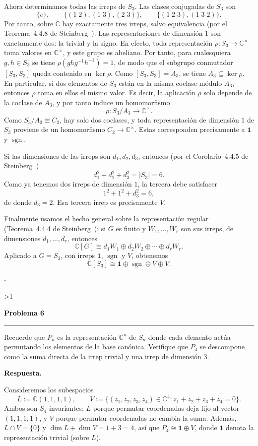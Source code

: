 \documentclass[10pt,a4paper]{article}
\newcommand{\CC}{\mathbb{C}}
\newcommand{\inlinehead}[2][repblue]{%
  \par\smallskip
  {\color{#1}\bfseries #2.}\hspace{0.45em}%
}
\newcommand{\answer}{\inlinehead{Respuesta}}
\newcounter{probcnt}
\newcommand{\problem}[2]{%
  \stepcounter{probcnt}%
  \ifnum\value{probcnt}>1\newpage\fi
  \par\vspace{0.25em}
  {\large\bfseries\color{repblue} Problema #1}\par
  {\color{repline}\rule{\linewidth}{0.55pt}}\par
  \begin{tcolorbox}[
    breakable,
    colback=white,
    colframe=repline,
    borderline west={1.6pt}{0pt}{repteal},
    left=0.7em,
    right=0.7em,
    top=0.35em,
    bottom=0.3em,
    before skip=0.35em,
    after skip=0.45em
  ]
    #2
  \end{tcolorbox}
}
\begin{document}
Ahora determinamos todas las irreps de $S_3$.
Las clases conjugadas de $S_3$ son
\[
  \{e\},\qquad \{(1\;2),(1\;3),(2\;3)\},\qquad \{(1\;2\;3),(1\;3\;2)\}.
\]
Por tanto, sobre $\CC$ hay exactamente tres irreps, salvo equivalencia
(por el Teorema~4.4.8 de Steinberg~\cite[Thm.~4.4.8]{Steinberg}).
Las representaciones de dimensión $1$ son exactamente dos: la trivial
y la signo. En efecto, toda representación $\rho\colon S_3\to \CC^{\times}$
toma valores en $\CC^{\times}$, y este grupo es abeliano.
Por tanto, para cualesquiera $g,h\in S_3$ se tiene
$\rho(ghg^{-1}h^{-1})=1$, de modo que el subgrupo conmutador
$[S_3,S_3]$ queda contenido en $\ker\rho$.
Como $[S_3,S_3]=A_3$, se tiene $A_3\subseteq \ker\rho$. En particular,
si dos elementos de $S_3$ están en la misma coclase módulo $A_3$,
entonces $\rho$ toma en ellos el mismo valor. Es decir, la aplicación
$\rho$ solo depende de la coclase de $A_3$, y por tanto induce un
homomorfismo
\[
  \overline\rho\colon S_3/A_3 \longrightarrow \CC^{\times}.
\]
Como $S_3/A_3\cong C_2$, hay solo dos coclases, y toda representación de
dimensión $1$ de $S_3$ proviene de un homomorfismo $C_2\to \CC^{\times}$.
Estas corresponden precisamente a $\mathbf 1$ y $\operatorname{sgn}$.

Si las dimensiones de las irreps son $d_1,d_2,d_3$, entonces
(por el Corolario~4.4.5 de Steinberg~\cite[Cor.~4.4.5]{Steinberg})
\[
  d_1^2+d_2^2+d_3^2=|S_3|=6.
\]
Como ya tenemos dos irreps de dimensión $1$, la tercera debe satisfacer
\[
  1^2+1^2+d_3^2=6,
\]
de donde $d_3=2$.
Esa tercera irrep es precisamente $V$.

Finalmente usamos el hecho general sobre la representación regular
(Teorema~4.4.4 de Steinberg~\cite[Thm.~4.4.4]{Steinberg}):
si $G$ es finito y $W_1,\dots,W_r$ son sus irreps, de dimensiones
$d_1,\dots,d_r$, entonces
\[
  \CC[G]\cong d_1W_1\oplus d_2W_2\oplus \cdots \oplus d_rW_r.
\]
Aplicado a $G=S_3$, con irreps $\mathbf 1$, $\operatorname{sgn}$ y $V$,
obtenemos
\[
  \CC[S_3]\cong \mathbf 1\oplus \operatorname{sgn}\oplus V\oplus V.
\]

\hfill$\square$
\endgroup

\problem{6}{%
Recuerde que $P_n$ es la representación $\CC^n$ de $S_n$ donde cada
elemento actúa permutando los elementos de la base canónica. Verifique
que $P_4$ se descompone como la suma directa de la irrep trivial y una
irrep de dimensión $3$.
}

\answer
Consideremos los subespacios
\[
  L:=\CC(1,1,1,1),
  \qquad
  V:=\{(z_1,z_2,z_3,z_4)\in\CC^4:z_1+z_2+z_3+z_4=0\}.
\]
Ambos son $S_4$-invariantes: $L$ porque permutar coordenadas deja fijo
al vector $(1,1,1,1)$, y $V$ porque permutar coordenadas no cambia la suma.
Además, $L\cap V=\{0\}$ y $\dim L+\dim V=1+3=4$, así que
$P_4\cong \mathbf 1\oplus V$,
donde $\mathbf 1$ denota la representación trivial (sobre $L$).
\end{document}
